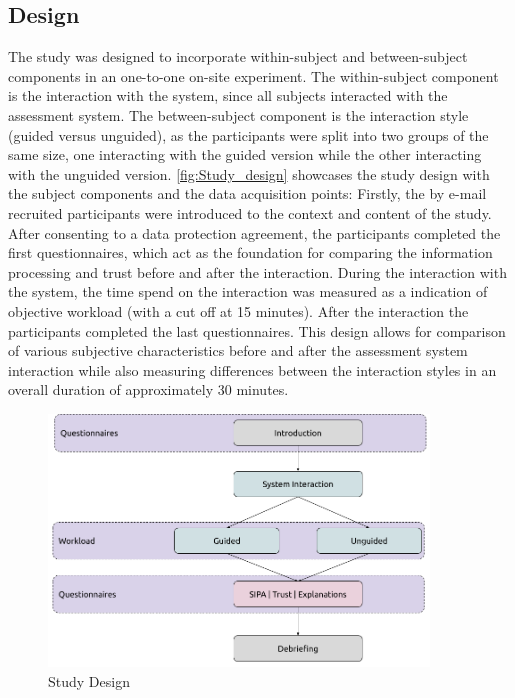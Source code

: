 \documentclass[11pt,a4paper,english]{scrreprt}
\begin{document}
\subsection{Design}
The study was designed to incorporate within-subject and between-subject components in an one-to-one on-site experiment. The within-subject component is the interaction with the system, since all subjects interacted with the assessment system. The between-subject component is the interaction style (guided versus unguided), as the participants were split into two groups of the same size, one interacting with the guided version while the other interacting with the unguided version. \autoref{fig:Study_design} showcases the study design with the subject components and the data acquisition points: Firstly, the by e-mail recruited participants were introduced to the context and content of the study. After consenting to a data protection agreement, the participants completed the first questionnaires, which act as the foundation for comparing the information processing and trust before and after the interaction. During the interaction with the system, the time spend on the interaction was measured as a indication of objective workload (with a cut off at 15 minutes). After the interaction the participants completed the last questionnaires. This design allows for comparison of various subjective characteristics before and after the assessment system interaction while also measuring differences between the interaction styles in an overall duration of approximately 30 minutes.

\begin{figure}[htbp]
    \centering
    \includegraphics[width=0.9\textwidth]{img/study_design.png}
    \caption{Study Design}
    \label{fig:Study_design}
\end{figure}
\end{document}
